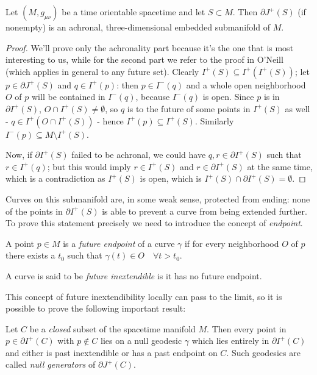\begin{theorem}
	Let \((M, g_{\mu\nu})\) be a time orientable spacetime and let \(S\subset M\). Then \(\partial J^+(S)\) (if nonempty) is an achronal, three-dimensional embedded submanifold of \(M\).
\end{theorem}
\begin{proof}
	We'll prove only the achronality part because it's the one that is most interesting to 
	us, while for the second part we refer to the proof in O'Neill~\cite{o1983semi} (which applies in general 
	to any future set). Clearly \(I^+(S) \subseteq I^+(I^+(S))\); 
	let \(p\in \partial J^+(S)\) and \(q \in I^+(p)\): then \(p \in I^-(q)\) and a whole open neighborhood \(O\)  of \(p\) will be contained in \(I^-(q)\), 
	because \(I^-(q)\) is open. 
	Since \(p\) is in \(\partial I^+(S)\), \(O \cap I^+(S) \neq \emptyset\), so \(q\) is to the future of some points in \(I^+(S)\) as well - \(q \in I^+(O \cap I^+(S)) \) -
	 hence \(I^+(p) \subseteq I^+(S)\). 
	 Similarly \(I^-(p) \subseteq M \setminus I^+(S)\).
	
	Now, if \(\partial I^+(S)\) failed to be achronal, we could have 
	\(q,r \in \partial I^+(S)\) such that \(r \in I^+(q)\); but this would imply 
	\(r \in I^+(S)\) and \(r \in \partial I^+(S)\) at the same time, which is a 
	contradiction as \(I^+(S)\) is open, which is 
	\(I^+(S) \cap \partial I^+(S) = \emptyset\).
\end{proof}

Curves on this submanifold are, in some weak sense, protected from ending: none of the points in \(\partial I^+(S)\) is able to prevent a curve from being extended further. To prove this statement precisely we need to introduce the concept of \emph{endpoint}.
	\begin{definition}
		A point \(p\in M\) is a \emph{future endpoint} of a curve \(\gamma\) if for every neighborhood \(O\) of \(p\) there exists a \(t_0\) such that \(\gamma(t) \in O \quad \forall t >t_0\). 
		
		A curve is said to be \emph{future inextendible} is it has no future endpoint.
	\end{definition}

	This concept of future inextendibility locally can pass to the limit, 
	so it is possible to prove the following important result:
\begin{theorem}
	\label{th:null-generator}
	Let \(C\) be a \emph{closed} subset of the spacetime manifold \(M\). 
	Then every point in \(p\in \partial I^+(C)\) with \(p \notin C\) lies on a null 
	geodesic \(\gamma\) which lies entirely in \(\partial I^+(C)\) and either is 
	past inextendible or has a past endpoint on \(C\). Such geodesics are called \emph{null generators} of \(\partial J^+(C)\).
\end{theorem}

